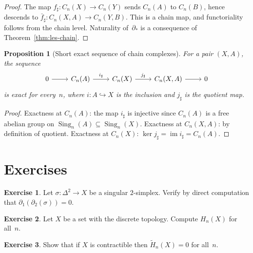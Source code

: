\documentclass[12pt,a4paper,openany]{book}
\theoremstyle{definition}
\newtheorem{exercise}{Exercise}[chapter]
\theoremstyle{plain}
\newtheorem{proposition}[definition]{Proposition}
\theoremstyle{remark}
\DeclareMathOperator{\im}{im}
\begin{document}
\begin{proof}
The map $f_\sharp\colon C_n(X)\to C_n(Y)$ sends $C_n(A)$ to $C_n(B)$,
hence descends to $\bar{f}_\sharp\colon C_n(X,A)\to C_n(Y,B)$.  This
is a chain map, and functoriality follows from the chain level.
Naturality of~$\partial_*$ is a consequence of Theorem~\ref{thm:les-chain}.
\end{proof}

\begin{proposition}[Short exact sequence of chain complexes]\label{prop:ses-chains}
For a pair $(X,A)$, the sequence
\[
\begin{tikzcd}
  0 \ar[r]
  & C_n(A) \ar[r,"i_\sharp"]
  & C_n(X) \ar[r,"j_\sharp"]
  & C_n(X,A) \ar[r]
  & 0
\end{tikzcd}
\]
is exact for every~$n$, where $i\colon A\hookrightarrow X$ is the inclusion
and $j_\sharp$ is the quotient map.
\end{proposition}

\begin{proof}
Exactness at $C_n(A)$: the map $i_\sharp$ is injective since $C_n(A)$
is a free abelian group on $\operatorname{Sing}_n(A)\subseteq\operatorname{Sing}_n(X)$.
Exactness at $C_n(X,A)$: by definition of quotient.
Exactness at $C_n(X)$: $\ker j_\sharp=\im i_\sharp=C_n(A)$.
\end{proof}

\section{Exercises}\label{sec:ex-ch5}

\begin{exercise}\label{exo:simplicial-boundary-2simplex}
Let $\sigma\colon\Delta^2\to X$ be a singular $2$-simplex.  Verify by
direct computation that $\partial_1(\partial_2(\sigma))=0$.
\end{exercise}

\begin{exercise}\label{exo:h0-discrete}
Let $X$ be a set with the discrete topology.  Compute $H_n(X)$ for all~$n$.
\end{exercise}

\begin{exercise}\label{exo:homology-contractible}
Show that if $X$ is contractible then $\widetilde{H}_n(X)=0$ for all~$n$.
\end{exercise}
\end{document}
